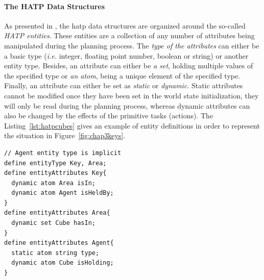 \documentclass[a4paper,11pt,twoside]{StyleThese}
\begin{document}

\paragraph{The HATP Data Structures}
As presented in \cite{de2015hatp}, the \acrshort{hatp} data structures are organized around the so-called \textit{HATP entities}. These entities are a collection of any number of attributes being manipulated during the planning process. The \textit{type of the attributes} can either be a basic type (\textit{i.e.} integer, floating point number, boolean or string) or another entity type. Besides, an attribute can either be \textit{a set}, holding multiple values of the specified type or \textit{an atom}, being a unique element of the specified type. Finally, an attribute can either be set as \textit{static} or \textit{dynamic}. Static attributes cannot be modified once they have been set in the world state initialization, they will only be read during the planning process, whereas dynamic attributes can also be changed by the effects of the primitive tasks (actions). The Listing~\ref{lst:hatpcubes} gives an example of entity definitions in order to represent the situation in Figure~\ref{fig:chap3keys}.

\begin{lstlisting}[caption={Example of a part of the HATP domain describing the situation of Figure~\ref{fig:chap3keys}.}, label={lst:hatpcubes}, emph={define, entityType, entityAttributes, dynamic, atom, set, static}, emphstyle={\bfseries}, captionpos=b, frame=single]
// Agent entity type is implicit
define entityType Key, Area;
define entityAttributes Key{
  dynamic atom Area isIn;
  dynamic atom Agent isHeldBy;
}
define entityAttributes Area{
  dynamic set Cube hasIn;
}
define entityAttributes Agent{
  static atom string type;
  dynamic atom Cube isHolding;
}
\end{lstlisting}
\end{document}
